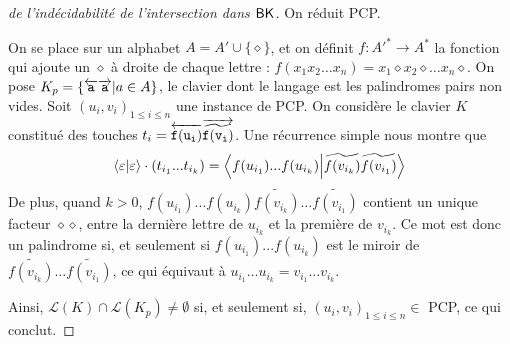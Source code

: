 \documentclass[12pt, a4paper]{article}
\renewcommand{\L}{\mathcal{L}}
\begin{document}
    \begin{proof}[de l'indécidabilité de l'intersection dans $\mathsf{BK}$] 
        
        On réduit PCP.

        On se place sur un alphabet $A = A' \cup \{\diamond\}$, et on définit $f : A'^* \to A^*$ la fonction qui ajoute un $\diamond$ à droite de chaque lettre : $f(x_1x_2\dots x_n) = x_1\diamond x_2 \diamond \dots x_n \diamond$.
        On pose $K_p = \{\overleftarrow{\mathtt{a}}\overrightarrow{\mathtt{a}} | a \in A\}$, le clavier dont le langage est les palindromes pairs non vides.
        Soit $(u_i,v_i)_{1\leqslant i \leqslant n}$ une instance de PCP. On considère le clavier $K$ constitué des touches $t_i = \overleftarrow{\mathtt{f(u_i)}}\overrightarrow{\mathtt{\widetilde{f(v_i)}}}$.
        Une récurrence simple nous montre que 
        \[\left\langle \varepsilon \middle| \varepsilon \right\rangle\cdot(t_{i_1}...t_{i_k}) = \left\langle f(u_{i_1})...f(u_{i_k}) \middle| \widetilde{f(v_{i_k})}\widetilde{f(v_{i_1})} \right\rangle\]
        De plus, quand $k>0$, $f(u_{i_1})...f(u_{i_k})\widetilde{f(v_{i_k})}\dots\widetilde{f(v_{i_1})}$ contient un unique facteur $\diamond\diamond$, 
        entre la dernière lettre de $u_{i_k}$ et la première de $v_{i_k}$. Ce mot est donc un palindrome si, et seulement si
        $f(u_{i_1})...f(u_{i_k})$ est le miroir de $\widetilde{f(v_{i_k})}\dots\widetilde{f(v_{i_1})}$, ce qui équivaut à $u_{i_1}\dots u_{i_k} = v_{i_1} \dots v_{i_k}$.

        Ainsi, $\L(K) \cap \L(K_p) \neq \emptyset$ si, et seulement si, $(u_i,v_i)_{1\leqslant i \leqslant n} \in$ PCP, ce qui conclut.        
    \end{proof}
    \clearpage
    \printbibliography
\end{document}
